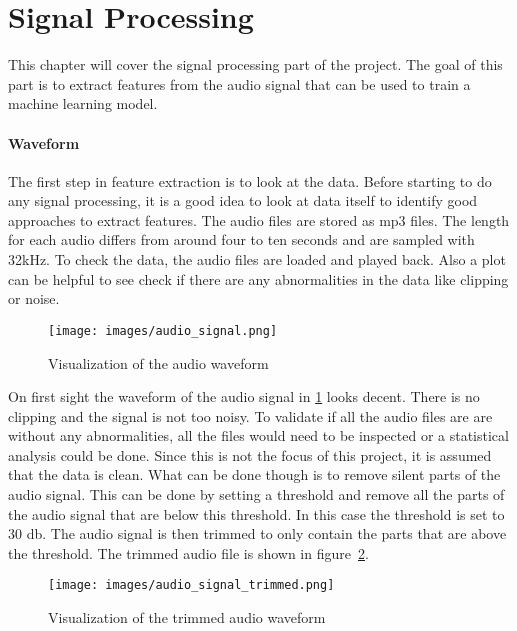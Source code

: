 \section{Signal Processing}
This chapter will cover the signal processing part of the project. The goal of this part is to extract features from the audio signal that can be used to train a machine learning model. 

\paragraph{Waveform}
The first step in feature extraction is to look at the data. Before starting to do any signal processing, it is a good idea to look at data itself to identify good approaches to extract features. The audio files are stored as mp3 files. The length for each audio differs from around four to ten seconds and are sampled with 32kHz. To check the data, the audio files are loaded and played back. Also a plot can be helpful to see check if there are any abnormalities in the data like clipping or noise.

\begin{figure}[h] %
    \centering %
    \texttt{[image: images/audio\_signal.png]}
    \caption{Visualization of the audio waveform} %
    \label{fig:audiosignal} %
\end{figure}

On first sight the waveform of the audio signal in \ref{fig:audiosignal} looks decent. There is no clipping and the signal is not too noisy. To validate if all the audio files are are without any abnormalities, all the files would need to be inspected or a statistical analysis could be done. Since this is not the focus of this project, it is assumed that the data is clean. What can be done though is to remove silent parts of the audio signal. This can be done by setting a threshold and remove all the parts of the audio signal that are below this threshold. In this case the threshold is set to 30 db. The audio signal is then trimmed to only contain the parts that are above the threshold. The trimmed audio file is shown in figure~\ref{fig:audiosignaltrimmed}.

\begin{figure}[h] %
    \centering %
    \texttt{[image: images/audio\_signal\_trimmed.png]}
    \caption{Visualization of the trimmed audio waveform} %
    \label{fig:audiosignaltrimmed} %
\end{figure}

